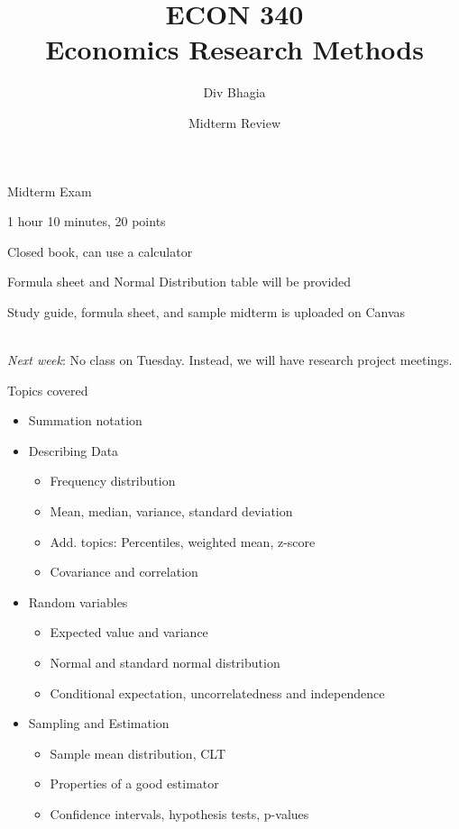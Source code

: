 \documentclass{./../div_teaching_slides}
\begin{document}
\title{ECON 340 \\ Economics Research Methods}
\author{Div Bhagia}
\date{Midterm Review}

\begin{frame}
\maketitle
\end{frame}

\begin{frame}{Midterm Exam}
\begin{witemize}
	\item 1 hour 10 minutes, 20 points 
	\item Closed book, can use a calculator 
	\item Formula sheet and Normal Distribution table will be provided 
	\item Study guide, formula sheet, and sample midterm is uploaded on Canvas \\~\\
\end{witemize}

\textit{Next week}: No class on Tuesday. Instead, we will have research project meetings. 
\end{frame}

\begin{frame}{Topics covered}
\vspace{-0.85em}
\begin{itemize}
\item Summation notation
\item Describing Data \\ 
\begin{itemize}
\item Frequency distribution
\item Mean, median, variance, standard deviation 
\item Add. topics: Percentiles, weighted mean, z-score
\item Covariance and correlation
\end{itemize}
\item Random variables \\
\begin{itemize}
\item Expected value and variance 
\item Normal and standard normal distribution
\item Conditional expectation, uncorrelatedness and independence
\end{itemize}
\item Sampling and Estimation \\
\begin{itemize}
\item Sample mean distribution, CLT
\item Properties of a good estimator
\item Confidence intervals, hypothesis tests, p-values
\end{itemize}
\end{itemize}
\end{frame}
\end{document}
